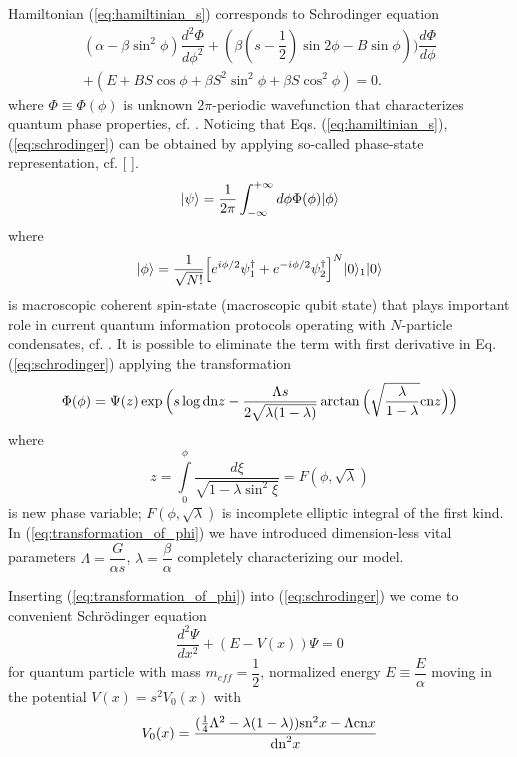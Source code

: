 \documentclass[aps, pre, preprint, groupedaddress, superscriptaddress, showkeys, showpacs] {revtex4-1}
\DeclarePairedDelimiter\ket{\lvert}{\rangle}
\begin{document}
Hamiltonian (\ref{eq:hamiltinian_s}) corresponds to Schrodinger equation
%
\begin{equation}
\begin{array}{l}
(\alpha - \beta \sin^2 \phi) \dfrac{d^2 \Phi}{d \phi^2} + (\beta(s - \dfrac{1}{2})\sin{2\phi}-B\sin{\phi})) \dfrac{d \Phi}{d \phi} \\
+ (E + BS \cos \phi + \beta S^2 \sin^2 \phi + \beta S \cos^2 \phi) = 0.
\end{array}
\label{eq:schrodinger}
\end{equation}
%
where $\Phi \equiv \Phi(\phi)$ is unknown $2\pi$-periodic wavefunction that characterizes quantum phase properties, cf. \cite{40}.
Noticing that Eqs. (\ref{eq:hamiltinian_s}), (\ref{eq:schrodinger}) can be obtained by applying so-called phase-state representation, {\red cf. [  ]}.
%
\begin{equation}
\ket{\psi} = \dfrac{1}{2 \pi} \int_{-\infty}^{+\infty} d \phi \Phi(\phi) \ket{\phi}
\end{equation}
%
where
%
\begin{equation}
\ket{\phi} = \dfrac{1}{\sqrt{N!}} \Big[ e^{i\phi/2} \psi_1^\dagger + e^{-i \phi/2} \psi_2^\dag \Big]^N \ket{0}_1\ket{0}
\end{equation}
%
is macroscopic coherent spin-state (macroscopic qubit state) that plays important role in current quantum information protocols operating with $N$-particle condensates, cf. \cite{41}.
It is possible to eliminate the term with first derivative in Eq.(\ref{eq:schrodinger}) applying the transformation
%
\begin{equation}
\Phi(\phi) = \Psi(z) \exp \Big( s \log \textrm{dn}{z} - \dfrac{\Lambda s}{2 \sqrt{\lambda (1 - \lambda)}} \arctan \Big( \sqrt{\dfrac{\lambda}{1 - \lambda}} \textrm{cn}{z} \Big) \Big)
\label{eq:transformation_of_phi}
\end{equation}
%
where
%
\begin{equation}
z = \int \limits_0^\phi \dfrac{d \xi}{\sqrt{1 - \lambda \sin^2 \xi}} = F(\phi, \sqrt{\lambda})
\end{equation}
is new phase variable; $F(\phi, \sqrt{\lambda})$ is incomplete elliptic integral of the first kind.
In (\ref{eq:transformation_of_phi}) we have introduced dimension-less vital parameters $\Lambda = \dfrac{G}{\alpha s}$, $\lambda = \dfrac{\beta}{\alpha}$ completely characterizing our model.

Inserting (\ref{eq:transformation_of_phi}) into (\ref{eq:schrodinger}) we come to convenient Schr\"odinger equation
%
\begin{equation}
\dfrac{d^2\Psi}{dx^2} + (E - V(x))\Psi = 0
\label{eq:schrodinger_usual}
\end{equation}
%
for quantum particle with mass $m_{eff} = \dfrac{1}{2}$, normalized energy $E \equiv \dfrac{E}{\alpha}$ moving in the potential $V(x) = s^2 V_0(x)$ with
%
\begin{equation}
V_0(x) = \frac{ (\frac{1}{4} \Lambda^2 - \lambda (1 - \lambda)) \textrm{sn}^2{x} - \Lambda \textrm{cn}{x}}{\textrm{dn}^2{x}}
\label{eq:potential}
\end{equation}
%
\end{document}
